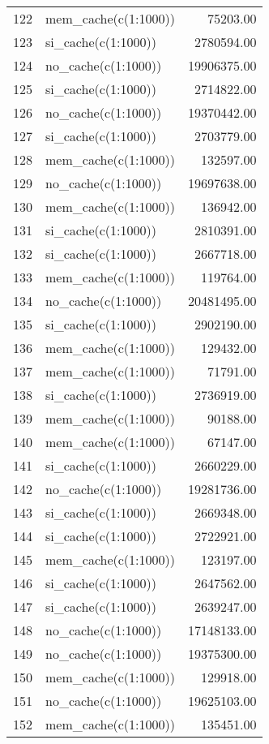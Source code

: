 \begin{table}[ht]
\begin{tabular}{rlr}
  122 & mem\_cache(c(1:1000)) & 75203.00 \\ 
  123 & si\_cache(c(1:1000)) & 2780594.00 \\ 
  124 & no\_cache(c(1:1000)) & 19906375.00 \\ 
  125 & si\_cache(c(1:1000)) & 2714822.00 \\ 
  126 & no\_cache(c(1:1000)) & 19370442.00 \\ 
  127 & si\_cache(c(1:1000)) & 2703779.00 \\ 
  128 & mem\_cache(c(1:1000)) & 132597.00 \\ 
  129 & no\_cache(c(1:1000)) & 19697638.00 \\ 
  130 & mem\_cache(c(1:1000)) & 136942.00 \\ 
  131 & si\_cache(c(1:1000)) & 2810391.00 \\ 
  132 & si\_cache(c(1:1000)) & 2667718.00 \\ 
  133 & mem\_cache(c(1:1000)) & 119764.00 \\ 
  134 & no\_cache(c(1:1000)) & 20481495.00 \\ 
  135 & si\_cache(c(1:1000)) & 2902190.00 \\ 
  136 & mem\_cache(c(1:1000)) & 129432.00 \\ 
  137 & mem\_cache(c(1:1000)) & 71791.00 \\ 
  138 & si\_cache(c(1:1000)) & 2736919.00 \\ 
  139 & mem\_cache(c(1:1000)) & 90188.00 \\ 
  140 & mem\_cache(c(1:1000)) & 67147.00 \\ 
  141 & si\_cache(c(1:1000)) & 2660229.00 \\ 
  142 & no\_cache(c(1:1000)) & 19281736.00 \\ 
  143 & si\_cache(c(1:1000)) & 2669348.00 \\ 
  144 & si\_cache(c(1:1000)) & 2722921.00 \\ 
  145 & mem\_cache(c(1:1000)) & 123197.00 \\ 
  146 & si\_cache(c(1:1000)) & 2647562.00 \\ 
  147 & si\_cache(c(1:1000)) & 2639247.00 \\ 
  148 & no\_cache(c(1:1000)) & 17148133.00 \\ 
  149 & no\_cache(c(1:1000)) & 19375300.00 \\ 
  150 & mem\_cache(c(1:1000)) & 129918.00 \\ 
  151 & no\_cache(c(1:1000)) & 19625103.00 \\ 
  152 & mem\_cache(c(1:1000)) & 135451.00 \\ 

\end{tabular}
\end{table}

